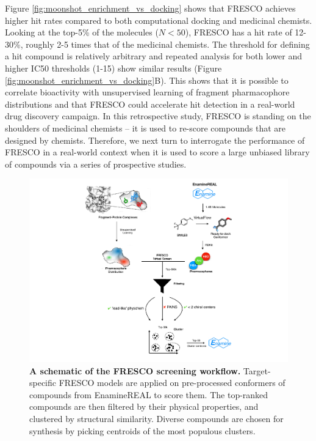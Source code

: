 Figure \ref{fig:moonshot_enrichment_vs_docking} shows that FRESCO achieves higher hit rates compared to both computational docking and medicinal chemists. Looking at the top-5\% of the molecules ($N<50$), FRESCO has a hit rate of 12-30\%, roughly 2-5 times that of the medicinal chemists. The threshold for defining a hit compound is relatively arbitrary and repeated analysis for both lower and higher IC50 thresholds (1-15\uM) show similar results (Figure \ref{fig:moonshot_enrichment_vs_docking}B). This shows that it is possible to correlate bioactivity with unsupervised learning of fragment pharmacophore distributions and that FRESCO could accelerate hit detection in a real-world drug discovery campaign. In this retrospective study, FRESCO is standing on the shoulders of medicinal chemists -- it is used to re-score compounds that are designed by chemists. Therefore, we next turn to interrogate the performance of FRESCO in a real-world context when it is used to score a large unbiased library of compounds via a series of prospective studies. 


\begin{figure}[!h]
 \centering
 \includegraphics[width=\linewidth]{Chapters/Fresco/Figs/flowchart_details.pdf}
 \caption{\textbf{A schematic of the FRESCO screening workflow.} Target-specific FRESCO models are applied on pre-processed conformers of compounds from EnamineREAL to score them. The top-ranked compounds are then filtered by their physical properties, and clustered by structural similarity. Diverse compounds are chosen for synthesis by picking centroids of the most populous clusters.}
 \label{fig:screening_workflow}
\end{figure}

